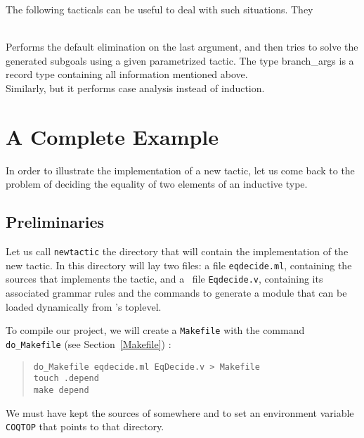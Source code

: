 The following tacticals can be useful to deal with such situations.
They  

\begin{description}
    {\\ Performs the default elimination on the last argument, and then
     tries to solve the generated subgoals using a given parametrized
     tactic. The type branch\_args is a record type containing all 
     information mentioned above.}
    {\\ Similarly, but it performs case analysis instead of induction.}
\end{description}

\section[A Complete Example]{A Complete Example\label{ACompleteExample}}

In order to illustrate the implementation of a new tactic, let us come
back to the problem of deciding the equality of two elements of an
inductive type.

\subsection{Preliminaries}

Let us call \texttt{newtactic} the directory that will contain the
implementation of the new tactic. In this directory will lay two
files: a file \texttt{eqdecide.ml}, containing the \ocaml{} sources that
implements the tactic, and a \Coq\ file \texttt{Eqdecide.v}, containing
its associated grammar rules and the commands to generate a module
that can be loaded dynamically from \Coq's toplevel. 

To compile our project, we will create a \texttt{Makefile} with the
command \texttt{do\_Makefile} (see Section~\ref{Makefile}) :

\begin{quotation}
  \texttt{do\_Makefile eqdecide.ml EqDecide.v > Makefile}\\
  \texttt{touch .depend}\\
  \texttt{make depend}
\end{quotation}

We must have kept the sources of \Coq{} somewhere and to set an
environment variable \texttt{COQTOP} that points to that directory.

